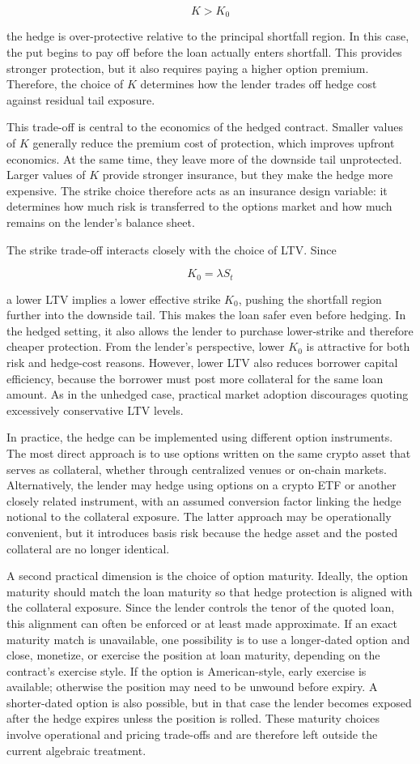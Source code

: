 \documentclass[11pt]{article}
\begin{document}
$$
K > K_0
$$

the hedge is over-protective relative to the principal shortfall region. In this case, the put begins to pay off before the loan actually enters shortfall. This provides stronger protection, but it also requires paying a higher option premium. Therefore, the choice of $K$ determines how the lender trades off hedge cost against residual tail exposure.

This trade-off is central to the economics of the hedged contract. Smaller values of $K$ generally reduce the premium cost of protection, which improves upfront economics. At the same time, they leave more of the downside tail unprotected. Larger values of $K$ provide stronger insurance, but they make the hedge more expensive. The strike choice therefore acts as an insurance design variable: it determines how much risk is transferred to the options market and how much remains on the lender’s balance sheet.

The strike trade-off interacts closely with the choice of LTV. Since

$$
K_0 = \lambda S_t
$$

a lower LTV implies a lower effective strike $K_0$, pushing the shortfall region further into the downside tail. This makes the loan safer even before hedging. In the hedged setting, it also allows the lender to purchase lower-strike and therefore cheaper protection. From the lender’s perspective, lower $K_0$ is attractive for both risk and hedge-cost reasons. However, lower LTV also reduces borrower capital efficiency, because the borrower must post more collateral for the same loan amount. As in the unhedged case, practical market adoption discourages quoting excessively conservative LTV levels.

In practice, the hedge can be implemented using different option instruments. The most direct approach is to use options written on the same crypto asset that serves as collateral, whether through centralized venues or on-chain markets. Alternatively, the lender may hedge using options on a crypto ETF or another closely related instrument, with an assumed conversion factor linking the hedge notional to the collateral exposure. The latter approach may be operationally convenient, but it introduces basis risk because the hedge asset and the posted collateral are no longer identical.

A second practical dimension is the choice of option maturity. Ideally, the option maturity should match the loan maturity so that hedge protection is aligned with the collateral exposure. Since the lender controls the tenor of the quoted loan, this alignment can often be enforced or at least made approximate. If an exact maturity match is unavailable, one possibility is to use a longer-dated option and close, monetize, or exercise the position at loan maturity, depending on the contract’s exercise style. If the option is American-style, early exercise is available; otherwise the position may need to be unwound before expiry. A shorter-dated option is also possible, but in that case the lender becomes exposed after the hedge expires unless the position is rolled. These maturity choices involve operational and pricing trade-offs and are therefore left outside the current algebraic treatment.
\end{document}
